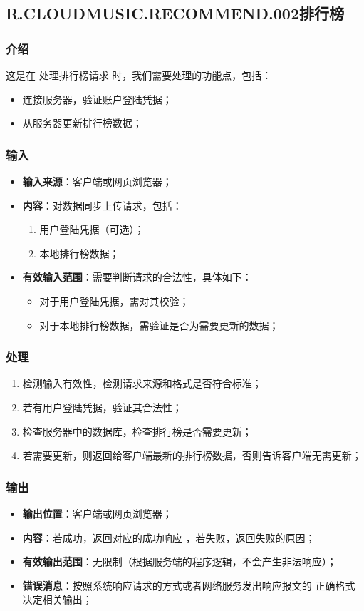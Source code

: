 \subsection{R.CLOUDMUSIC.RECOMMEND.002排行榜}
\subsubsection{介绍}
	这是在 处理排行榜请求 时，我们需要处理的功能点，包括：
	\begin{itemize}
		\item 连接服务器，验证账户登陆凭据；
		\item 从服务器更新排行榜数据；
	\end{itemize}
\subsubsection{输入}
	\begin{itemize}
		\item \textbf{输入来源}：客户端或网页浏览器；
		\item \textbf{内容}：对数据同步上传请求，包括：
		\begin{enumerate}
			\item 用户登陆凭据（可选）；
			\item 本地排行榜数据；
		\end{enumerate}
		\item \textbf{有效输入范围}：需要判断请求的合法性，具体如下：
		\begin{itemize}
			\item 对于用户登陆凭据，需对其校验； 
			\item 对于本地排行榜数据，需验证是否为需要更新的数据； 
		\end{itemize}
	\end{itemize}
\subsubsection{处理}
	\begin{enumerate}
		\item 检测输入有效性，检测请求来源和格式是否符合标准；
		\item 若有用户登陆凭据，验证其合法性；
		\item 检查服务器中的数据库，检查排行榜是否需要更新；
		\item 若需要更新，则返回给客户端最新的排行榜数据，否则告诉客户端无需更新；
	\end{enumerate}
\subsubsection{输出}
\begin{itemize}
	\item \textbf{输出位置}：客户端或网页浏览器；
	\item \textbf{内容}：若成功，返回对应的成功响应 ，若失败，返回失败的原因；
	\item \textbf{有效输出范围}：无限制（根据服务端的程序逻辑，不会产生非法响应）；
	\item \textbf{错误消息}：按照系统响应请求的方式或者网络服务发出响应报文的
		正确格式决定相关输出；
\end{itemize}

